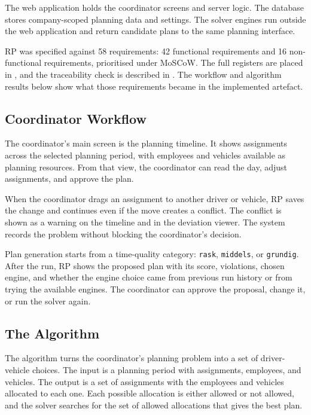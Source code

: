 The web application holds the coordinator screens and server logic. The database stores company-scoped planning data and settings. The solver engines run outside the web application and return candidate plans to the same planning interface.

RP was specified against 58 requirements: 42 functional requirements and 16 non-functional requirements, prioritised under MoSCoW. The full registers are placed in , and the traceability check is described in . The workflow and algorithm results below show what those requirements became in the implemented artefact.

\subsection{Coordinator Workflow}
\label{sec:coordinator-workflow}

The coordinator's main screen is the planning timeline. It shows assignments across the selected planning period, with employees and vehicles available as planning resources. From that view, the coordinator can read the day, adjust assignments, and approve the plan.

When the coordinator drags an assignment to another driver or vehicle, RP saves the change and continues even if the move creates a conflict. The conflict is shown as a warning on the timeline and in the deviation viewer. The system records the problem without blocking the coordinator's decision.

Plan generation starts from a time-quality category: \texttt{rask}, \texttt{middels}, or \texttt{grundig}. After the run, RP shows the proposed plan with its score, violations, chosen engine, and whether the engine choice came from previous run history or from trying the available engines. The coordinator can approve the proposal, change it, or run the solver again.

\subsection{The Algorithm}
\label{sec:algorithm-implementation}

The algorithm turns the coordinator's planning problem into a set of driver-vehicle choices. The input is a planning period with assignments, employees, and vehicles. The output is a set of assignments with the employees and vehicles allocated to each one. Each possible allocation is either allowed or not allowed, and the solver searches for the set of allowed allocations that gives the best plan.

